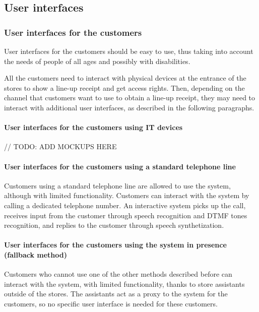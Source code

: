 \documentclass[../../main.tex]{subfiles}
\begin{document}
\subsection{User interfaces}

  \subsubsection{User interfaces for the customers}

  User interfaces for the customers should be easy to use, thus taking into account the needs of people of all ages and possibly with disabilities.

  All the customers need to interact with physical devices at the entrance of the stores to show a line-up receipt and get access rights. Then, depending on the channel that customers want to use to obtain a line-up receipt, they may need to interact with additional user interfaces, as described in the following paragraphs.

  \paragraph{User interfaces for the customers using IT devices}

  // TODO: ADD MOCKUPS HERE

  \paragraph{User interfaces for the customers using a standard telephone line}

  Customers using a standard telephone line are allowed to use the system, although with limited functionality. Customers can interact with the system by calling a dedicated telephone number. An interactive system picks up the call, receives input from the customer through speech recognition and DTMF tones recognition, and replies to the customer through speech synthetization.

  \paragraph{User interfaces for the customers using the system in presence (fallback method)}

  Customers who cannot use one of the other methods described before can interact with the system, with limited functionality, thanks to store assistants outside of the stores. The assistants act as a proxy to the system for the customers, so no specific user interface is needed for these customers.
\end{document}
